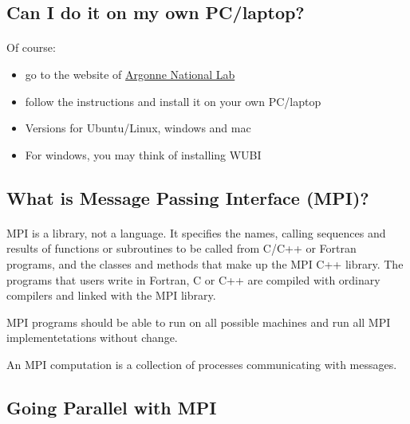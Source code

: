 \documentclass[%
twoside,                 %
final,                   %
10pt]{article}
\begin{document}
\noindent


\subsection{Can I do it on my own PC/laptop?}

\paragraph{}
Of course:
\begin{itemize}
\item go to the website of \href{{http://www.mcs.anl.gov/research/projects/mpich2/}}{Argonne National Lab}

\item follow the instructions and install it on your own PC/laptop

\item Versions for Ubuntu/Linux, windows and mac

\item For windows, you may think of installing WUBI
\end{itemize}

\noindent



\subsection{What is Message Passing Interface (MPI)?}

\paragraph{}

MPI is a library, not a language. It specifies the names, calling sequences and results of functions
or subroutines to be called from C/C++ or Fortran programs, and the classes and methods that make up the MPI C++
library. The programs that users write in Fortran, C or C++ are compiled with ordinary compilers and linked
with the MPI library.

MPI programs should be able to run
on all possible machines and run all MPI implementetations without change.

An MPI computation is a collection of processes communicating with messages.


\subsection{Going Parallel with MPI}
\end{document}

